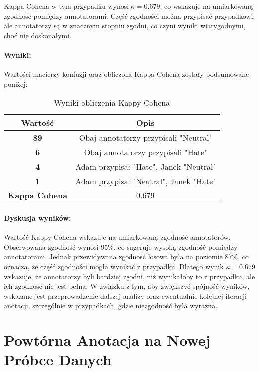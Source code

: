 \documentclass[12pt]{article}
\begin{document}
Kappa Cohena w tym przypadku wynosi \( \kappa = 0.679 \), co wskazuje na umiarkowaną zgodność pomiędzy annotatorami. Część zgodności można przypisać przypadkowi, ale annotatorzy są w znacznym stopniu zgodni, co czyni wyniki wiarygodnymi, choć nie doskonałymi.

\paragraph{Wyniki:}
Wartości macierzy konfuzji oraz obliczona Kappa Cohena zostały podsumowane poniżej:

\begin{table}[h!]
\centering
\begin{tabular}{|c|c|}
\hline
\textbf{Wartość}      & \textbf{Opis}                        \\ \hline
\textbf{89}           & Obaj annotatorzy przypisali "Neutral" \\ \hline
\textbf{6}            & Obaj annotatorzy przypisali "Hate"    \\ \hline
\textbf{4}            & Adam przypisał "Hate", Janek "Neutral" \\ \hline
\textbf{1}            & Adam przypisał "Neutral", Janek "Hate" \\ \hline
\textbf{Kappa Cohena} & 0.679                                 \\ \hline
\end{tabular}
\caption{Wyniki obliczenia Kappy Cohena}
\end{table}

\paragraph{Dyskusja wyników:}
Wartość Kappy Cohena wskazuje na umiarkowaną zgodność annotatorów. Obserwowana zgodność wynosi 95\%, co sugeruje wysoką zgodność pomiędzy annotatorami. Jednak przewidywana zgodność losowa była na poziomie 87\%, co oznacza, że część zgodności mogła wynikać z przypadku. Dlatego wynik \( \kappa = 0.679 \) wskazuje, że annotatorzy byli bardziej zgodni, niż wynikałoby to z przypadku, ale ich zgodność nie jest pełna. W związku z tym, aby zwiększyć spójność wyników, wskazane jest przeprowadzenie dalszej analizy oraz ewentualnie kolejnej iteracji anotacji, szczególnie w przypadkach, gdzie niezgodność była wyraźna.


\section{Powtórna Anotacja na Nowej Próbce Danych}
\end{document}
